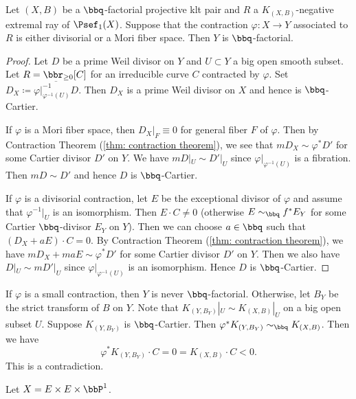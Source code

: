     \begin{proposition}\label{prop:divisorial_or_fibered_contraction_preverses_Q_factorial}
        Let \((X,B)\) be a \(\bbq\)-factorial projective klt pair and \(R\) a \(K_{(X,B)}\)-negative extremal ray of \(\Psef_1(X)\).
        Suppose that the contraction \(\varphi:X\to Y\) associated to \(R\) is either divisorial or a Mori fiber space. 
        Then \(Y\) is \(\bbq\)-factorial.
    \end{proposition}
    \begin{proof}
        Let \(D\) be a prime Weil divisor on \(Y\) and \(U \subset Y\) a big open smooth subset.
        Let \(R = \bbr_{\geq 0}[C]\) for an irreducible curve \(C\) contracted by \(\varphi\).
        Set \(D_X \coloneqq \overline{\varphi|_{\varphi^{-1}(U)}^{-1} D}\).
        Then \(D_X\) is a prime Weil divisor on \(X\) and hence is \(\bbq\)-Cartier.

        If \(\varphi\) is a Mori fiber space, then \(D_X|_F \equiv 0\) for general fiber \(F\) of \(\varphi\).
        Then by Contraction Theorem (\cref{thm: contraction theorem}), we see that \(mD_X \sim \varphi^* D'\) for some Cartier divisor \(D'\) on \(Y\).
        We have \(mD|_{U} \sim D'|_{U}\) since \(\varphi|_{\varphi^{-1}(U)}\) is a fibration.
        Then \(mD \sim D'\) and hence \(D\) is \(\bbq\)-Cartier.

        If \(\varphi\) is a divisorial contraction, let \(E\) be the exceptional divisor of \(\varphi\) and assume that \(\varphi^{-1}|_U\) is an isomorphism.
        Then \(E \cdot C \neq 0\) (otherwise \(E \sim_{\bbq} f^*E_Y\) for some Cartier \(\bbq\)-divisor \(E_Y\) on \(Y\)).
        Then we can choose \(a\in\bbq\) such that \((D_X + aE)\cdot C = 0\).
        By Contraction Theorem (\cref{thm: contraction theorem}), we have \(mD_X + maE \sim \varphi^* D'\) for some Cartier divisor \(D'\) on \(Y\).
        Then we also have \(D|_{U} \sim mD'|_{U}\) since \(\varphi|_{\varphi^{-1}(U)}\) is an isomorphism.
        Hence \(D\) is \(\bbq\)-Cartier.
    \end{proof}
    \begin{remark}\label{rmk:small_contraction_is_never_Q_factorial}
        If \(\varphi\) is a small contraction, then \(Y\) is never \(\bbq\)-factorial.
        Otherwise, let \(B_Y\) be the strict transform of \(B\) on \(Y\).
        Note that \(K_{(Y,B_Y)}|_U \sim K_{(X,B)}|_U\) on a big open subset \(U\).
        Suppose \(K_{(Y,B_Y)}\) is \(\bbq\)-Cartier.
        Then \(\varphi^*K_{(Y,B_Y)} \sim_\bbq K_{(X,B)}\).
        Then we have
        \[ \varphi^*K_{(Y,B_Y)}\cdot C = 0 = K_{(X,B)}\cdot C < 0. \]
        This is a contradiction.
    \end{remark}

    \begin{example}
        Let \(X = E\times E \times \bbP^1\).
    \end{example}

    